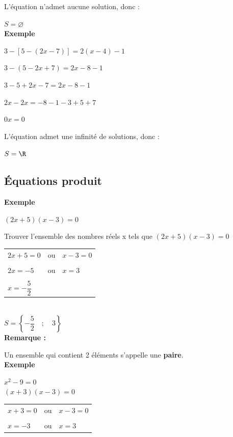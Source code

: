 L'équation n'admet aucune solution, donc : 

$ S = \varnothing $ \\

\textbf{Exemple }

$ 3 - \left[5-\left(2x-7\right)\right] = 2\left(x-4\right)-1 $

$ 3 - \left(5-2x+7\right) = 2x - 8 - 1 $ 

$ 3 - 5 + 2x - 7 = 2x - 8 -1 $

$ 2x - 2x = -8 -1 -3 + 5 + 7 $

$ 0x = 0 $ 

L'équation admet une infinité de solutions, donc :

$ S = \R $ 

\subsection{Équations produit}

\textbf{Exemple }

\vspace{.1cm}

$ \left(2x+5\right)\left(x-3\right)=0 $

Trouver l'ensemble des nombres réels x tels que $\left(2x+5\right)\left(x-3\right)=0 $ \\

\begin{tabular}{lcl}
$ 2x + 5 = 0 $ &  ou   & $ x-3 = 0 $ \\
&&\\
$ 2x = -5 $ & ou & $ x=3 $\\ 
&&\\
$x = -\dfrac{5}{2} $ &&\\
\end{tabular}\\

$ S = \left\lbrace -\dfrac{5}{2} \quad ; \quad 3 \right\rbrace $ \\

\textbf{Remarque :}

Un ensemble qui contient 2 éléments s'appelle une \textbf{paire}. \\

\textbf{Exemple }

$ x^2 - 9 = 0 $\\

$\left(x+3\right)\left(x-3\right) = 0 $\\

\begin{tabular}{lcl}
$ x+3 = 0 $ & ou &$ x-3 = 0 $\\
&&\\
$ x = -3 $ &ou& $ x =3 $ \\
\end{tabular}\\

